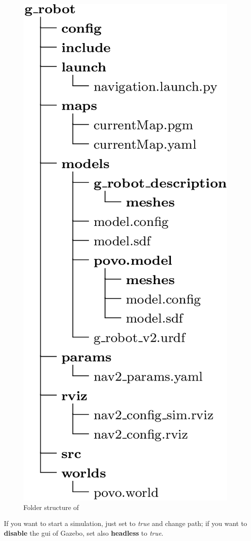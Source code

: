 \begin{figure}[h]
\begin{minipage}[h]{0.3\textwidth}
        \includegraphics[width=\textwidth]{images/g-robot}
        \caption{Folder structure of }
        \label{fig:folder}
    \end{minipage}
\end{figure}

\bigskip

If you want to start a simulation, just set  to \textit{true} and change  path; if you want to \textbf{disable} the \acrfull{gui} of Gazebo, set also \textbf{headless} to \textit{true}.

